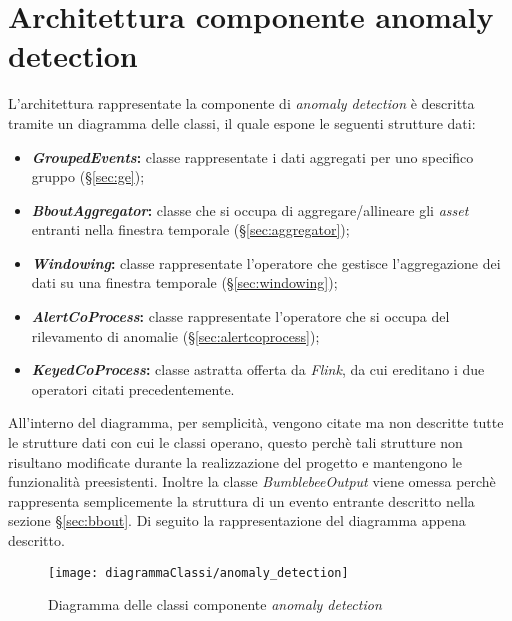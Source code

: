 

\section{Architettura componente anomaly detection}
L'architettura rappresentate la componente di \textit{anomaly detection} è descritta tramite un \gls{diagramma delle classi}, il quale espone le seguenti strutture dati:
\begin{itemize}
	\item{\textbf{\textit{GroupedEvents}:} classe rappresentate i dati aggregati per uno specifico gruppo (\S\ref{sec:ge});}
	\item{\textbf{\textit{BboutAggregator}:} classe che si occupa di aggregare/allineare gli \textit{asset} entranti nella finestra temporale (\S\ref{sec:aggregator});}
	\item{\textbf{\textit{Windowing}:} classe rappresentate l'operatore che gestisce l'aggregazione dei dati su una finestra temporale (\S\ref{sec:windowing});}
	\item{\textbf{\textit{AlertCoProcess}:} classe rappresentate l'operatore che si occupa del rilevamento di anomalie (\S\ref{sec:alertcoprocess});}
	\item{\textbf{\textit{KeyedCoProcess}:} classe astratta offerta da \textit{Flink}, da cui ereditano i due operatori citati precedentemente.}
\end{itemize}
All'interno del diagramma, per semplicità, vengono citate ma non descritte tutte le strutture dati con cui le classi operano, questo perchè tali strutture non risultano modificate durante la realizzazione del progetto e mantengono le funzionalità preesistenti. Inoltre la classe \textit{BumblebeeOutput} viene omessa perchè rappresenta semplicemente la struttura di un evento entrante descritto nella sezione \S\ref{sec:bbout}.
Di seguito la rappresentazione del diagramma appena descritto.

\newpage
\begin{figure}[H] 
    \centering 
    \texttt{[image: diagrammaClassi/anomaly\_detection]} 
    \caption{Diagramma delle classi componente \textit{anomaly detection}}
\end{figure}

